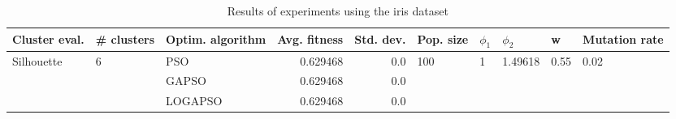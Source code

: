 \begin{table}
\centering
\caption{Results of experiments using the iris dataset}
\begin{tabular}{lllrrlllll}
\toprule
              Cluster eval. &        \# clusters & Optim. algorithm &  Avg. fitness &  Std. dev. &            Pop. size &         $\phi_{1}$ &               $\phi_{2}$ &                     w &         Mutation rate \\
\midrule
\multirow{3}{*}{Silhouette} & \multirow{3}{*}{6} &              PSO &      0.629468 &        0.0 & \multirow{3}{*}{100} & \multirow{3}{*}{1} & \multirow{3}{*}{1.49618} & \multirow{3}{*}{0.55} & \multirow{3}{*}{0.02} \\
                            &                    &            GAPSO &      0.629468 &        0.0 &                      &                    &                          &                       &                       \\
                            &                    &          LOGAPSO &      0.629468 &        0.0 &                      &                    &                          &                       &                       \\
\bottomrule
\end{tabular}
\end{table}
